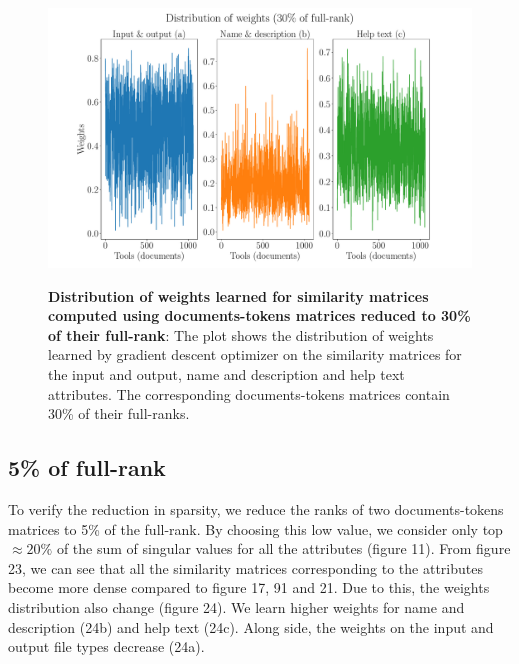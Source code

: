 \begin{figure}[h]
\begin{centering}
    {\includegraphics[scale=0.35]{figures/Weights_030.pdf}}
    \caption[Distribution of weights learned for similarity matrices computed using documents-tokens matrices reduced to 30\% of their full-rank]{\textbf{Distribution of weights learned for similarity matrices computed using documents-tokens matrices reduced to 30\% of their full-rank}: The plot shows the distribution of weights learned by gradient descent optimizer on the similarity matrices for the input and output, name and description and help text attributes. The corresponding documents-tokens matrices contain 30\% of their full-ranks.}
\end{centering}
\end{figure}

\subsection{5\% of full-rank}
To verify the reduction in sparsity, we reduce the ranks of two documents-tokens matrices to 5\% of the full-rank. By choosing this low value, we consider only top $\approx 20\%$ of the sum of singular values for all the attributes (figure 11). From figure 23, we can see that all the similarity matrices corresponding to the attributes become more dense compared to figure 17, 91 and 21. Due to this, the weights distribution also change (figure 24). We learn higher weights for name and description (24b) and help text (24c). Along side, the weights on the input and output file types decrease (24a).  

